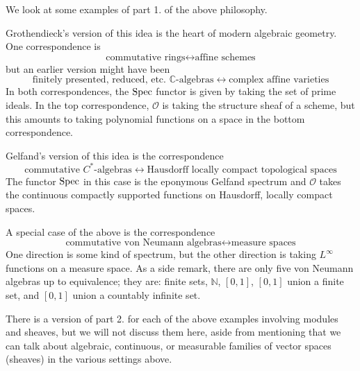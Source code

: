 \documentclass[../../rtnotes.tex]{subfiles}
\begin{document}
We look at some examples of part 1. of the above philosophy.

Grothendieck's version of this idea is the heart of modern algebraic geometry. One correspondence is 
\[\text{commutative rings}\longleftrightarrow\text{affine schemes}\]
but an earlier version might have been
\[\text{finitely presented, reduced, etc. $\mathbb C$-algebras}\longleftrightarrow\text{complex affine varieties}\]
In both correspondences, the $\operatorname{Spec}$ functor is given by taking the set of prime ideals. In the top correspondence, $\mathcal O$ is taking the structure sheaf of a scheme, but this amounts to taking polynomial functions on a space in the bottom correspondence.

Gelfand's version of this idea is the correspondence 
\[\text{commutative $C^\ast$-algebras}\longleftrightarrow\text{Hausdorff locally compact topological spaces}\]
The functor $\operatorname{Spec}$ in this case is the eponymous Gelfand spectrum and $\mathcal O$ takes the continuous compactly supported functions on Hausdorff, locally compact spaces.

A special case of the above is the correspondence 
\[\text{commutative von Neumann algebras}\longleftrightarrow\text{measure spaces}\]
One direction is some kind of spectrum, but the other direction is taking $L^\infty$ functions on a measure space. As a side remark, there are only five von Neumann algebras up to equivalence; they are: finite sets, $\mathbb N$, $[0,1]$, $[0,1]$ union a finite set, and $[0,1]$ union a countably infinite set.

There is a version of part 2. for each of the above examples involving modules and sheaves, but we will not discuss them here, aside from mentioning that we can talk about algebraic, continuous, or measurable families of vector spaces (sheaves) in the various settings above.
\end{document}
